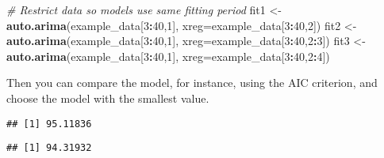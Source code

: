 \documentclass[
]{article}
\newenvironment{Shaded}{\begin{snugshade}}{\end{snugshade}}
\newcommand{\AttributeTok}[1]{\textcolor[rgb]{0.13,0.29,0.53}{#1}}
\newcommand{\CommentTok}[1]{\textcolor[rgb]{0.56,0.35,0.01}{\textit{#1}}}
\newcommand{\DecValTok}[1]{\textcolor[rgb]{0.00,0.00,0.81}{#1}}
\newcommand{\FunctionTok}[1]{\textcolor[rgb]{0.13,0.29,0.53}{\textbf{#1}}}
\newcommand{\NormalTok}[1]{#1}
\newcommand{\OtherTok}[1]{\textcolor[rgb]{0.56,0.35,0.01}{#1}}
\newcommand{\SpecialCharTok}[1]{\textcolor[rgb]{0.81,0.36,0.00}{\textbf{#1}}}
\begin{document}
\begin{Shaded}
\begin{Highlighting}[]
\CommentTok{\# Restrict data so models use same fitting period}
\NormalTok{fit1 }\OtherTok{\textless{}{-}} \FunctionTok{auto.arima}\NormalTok{(example\_data[}\DecValTok{3}\SpecialCharTok{:}\DecValTok{40}\NormalTok{,}\DecValTok{1}\NormalTok{], }\AttributeTok{xreg=}\NormalTok{example\_data[}\DecValTok{3}\SpecialCharTok{:}\DecValTok{40}\NormalTok{,}\DecValTok{2}\NormalTok{])}
\NormalTok{fit2 }\OtherTok{\textless{}{-}} \FunctionTok{auto.arima}\NormalTok{(example\_data[}\DecValTok{3}\SpecialCharTok{:}\DecValTok{40}\NormalTok{,}\DecValTok{1}\NormalTok{], }\AttributeTok{xreg=}\NormalTok{example\_data[}\DecValTok{3}\SpecialCharTok{:}\DecValTok{40}\NormalTok{,}\DecValTok{2}\SpecialCharTok{:}\DecValTok{3}\NormalTok{])}
\NormalTok{fit3 }\OtherTok{\textless{}{-}} \FunctionTok{auto.arima}\NormalTok{(example\_data[}\DecValTok{3}\SpecialCharTok{:}\DecValTok{40}\NormalTok{,}\DecValTok{1}\NormalTok{], }\AttributeTok{xreg=}\NormalTok{example\_data[}\DecValTok{3}\SpecialCharTok{:}\DecValTok{40}\NormalTok{,}\DecValTok{2}\SpecialCharTok{:}\DecValTok{4}\NormalTok{])}
\end{Highlighting}
\end{Shaded}

Then you can compare the model, for instance, using the AIC criterion, and choose the model with the smallest value.

\begin{Shaded}
\end{Shaded}

\begin{verbatim}
## [1] 95.11836
\end{verbatim}

\begin{Shaded}
\end{Shaded}

\begin{verbatim}
## [1] 94.31932
\end{verbatim}

\begin{Shaded}
\end{Shaded}
\end{document}
